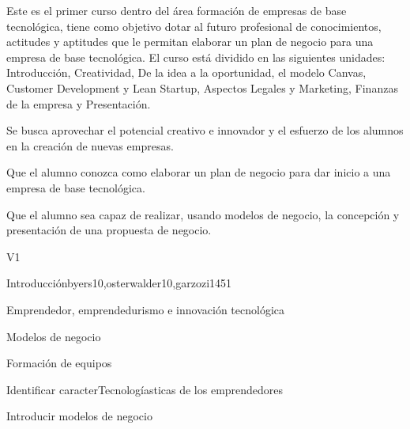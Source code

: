 \begin{syllabus}


\begin{justification}
   Este es el primer curso dentro del área formación de empresas de
   base tecnológica, tiene como objetivo dotar al futuro profesional 
   de conocimientos, actitudes y aptitudes que le
   permitan elaborar un plan de negocio para una empresa de base tecnológica.
   El curso está dividido en las siguientes unidades:
   Introducción, Creatividad, De la idea a la oportunidad, el modelo Canvas, Customer Development y Lean Startup, Aspectos Legales y Marketing, Finanzas de la empresa y Presentación.
   
   Se busca aprovechar el potencial creativo e innovador y el esfuerzo de los alumnos en la creación de nuevas empresas.
   \end{justification}
   
   \begin{goals}
   \item Que el alumno conozca como elaborar un plan de negocio para dar inicio a una empresa de base tecnológica.
   \item Que el alumno sea capaz de realizar, usando modelos de negocio, la concepción y presentación de una propuesta de negocio.
   \end{goals}
   
   \begin{outcomes}{V1}
      \item {}
      \item {}
      \item {}
   \end{outcomes}
   
   \begin{unit}{Introducción}{}{byers10,osterwalder10,garzozi14}{5}{1}
   \begin{topics}
         \item Emprendedor, emprendedurismo e innovación tecnológica
         \item Modelos de negocio
         \item Formación de equipos
      \end{topics}
   
      \begin{learningoutcomes}
         \item Identificar caracterTecnologíasticas de los emprendedores
         \item Introducir modelos de negocio 
      \end{learningoutcomes}
   \end{unit}
   

\end{syllabus}
